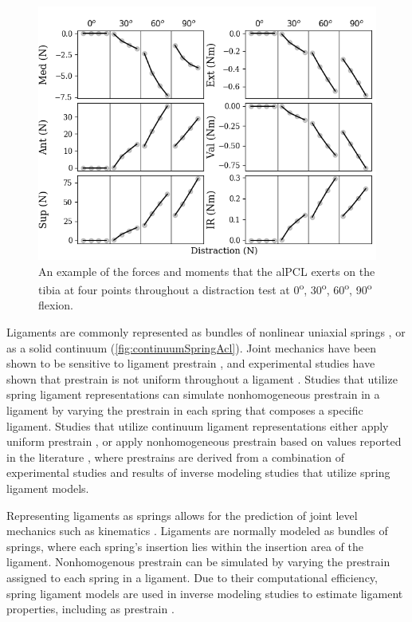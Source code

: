 \begin{figure}
    \centering
    \includegraphics[width=0.75\linewidth]{../img/Spec1_Distraction_alPCL_Forces.png}
    \caption{An example of the forces and moments that the alPCL exerts on the tibia at four points throughout a distraction test at 0\textsuperscript{o}, 30\textsuperscript{o}, 60\textsuperscript{o}, 90\textsuperscript{o} flexion.}
    \label{fig:alPclForce}
\end{figure}


Ligaments are commonly represented as bundles of nonlinear uniaxial springs \citep{blankevoort_validation_1996,baldwin_efficient_2009,ewing_estimating_2015}, or as a solid continuum \citep{gardiner_subject-specific_2003,pena_three-dimensional_2006,dhaher_effect_2010} (\autoref{fig:continuumSpringAcl}). Joint mechanics have been shown to be sensitive to ligament prestrain \citep{baldwin_efficient_2009}, and experimental studies have shown that prestrain is not uniform throughout a ligament \citep{hull_strain_1996,gardiner_strain_2001}. Studies that utilize spring ligament representations can simulate nonhomogeneous prestrain in a ligament by varying the prestrain in each spring that composes a specific ligament. Studies that utilize continuum ligament representations either apply uniform prestrain \citep{limbert_three-dimensional_2004,song_three-dimensional_2004,beidokhti_influence_2017}, or apply nonhomogeneous prestrain based on values reported in the literature \citep{pena_three-dimensional_2006,dhaher_effect_2010}, where prestrains are derived from a combination of experimental studies and results of inverse modeling studies that utilize spring ligament models.

Representing ligaments as springs allows for the prediction of joint level mechanics such as kinematics \citep{weiss_computational_2001}. Ligaments are normally modeled as bundles of springs, where each spring's insertion lies within the insertion area of the ligament. Nonhomogenous prestrain can be simulated by varying the prestrain assigned to each spring in a ligament. Due to their computational efficiency, spring ligament models are used in inverse modeling studies to estimate ligament properties, including as prestrain \citep{blankevoort_validation_1996,baldwin_dynamic_2012,ewing_estimating_2015,harris_combined_2016}.

